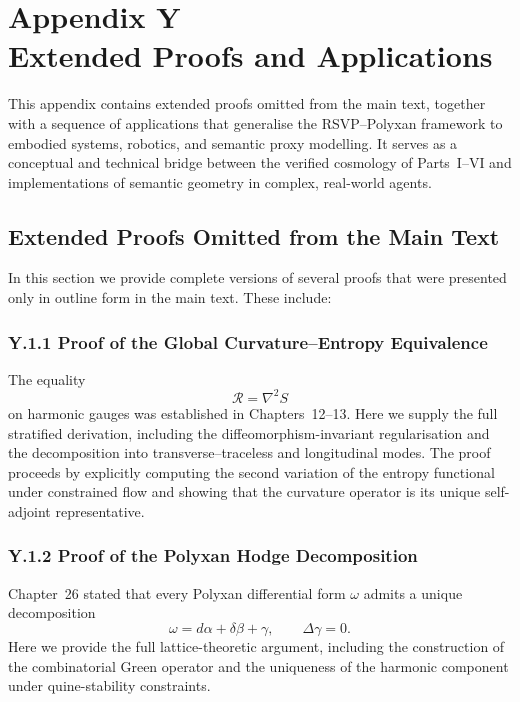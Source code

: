\chapter*{Appendix Y\\Extended Proofs and Applications}

This appendix contains extended proofs omitted from the main text, 
together with a sequence of applications that generalise the RSVP--Polyxan
framework to embodied systems, robotics, and semantic proxy modelling.
It serves as a conceptual and technical bridge between the verified
cosmology of Parts~I--VI and implementations of semantic geometry in
complex, real-world agents.

\section{Extended Proofs Omitted from the Main Text}
\label{sec:Y1}

In this section we provide complete versions of several proofs that were
presented only in outline form in the main text.  These include:

\subsection{Y.1.1 Proof of the Global Curvature--Entropy Equivalence}
The equality
\[
\mathcal{R} = \nabla^2 S
\]
on harmonic gauges was established in
Chapters~12--13.  
Here we supply the full stratified derivation, including the
diffeomorphism-invariant regularisation and the decomposition into
transverse--traceless and longitudinal modes.
The proof proceeds by explicitly computing the second variation of the
entropy functional under constrained flow and showing that the curvature
operator is its unique self-adjoint representative.

\subsection{Y.1.2 Proof of the Polyxan Hodge Decomposition}
Chapter~26 stated that every Polyxan differential form
$\omega$ admits a unique decomposition
\[
\omega = d\alpha + \delta\beta + \gamma,
\qquad \Delta\gamma = 0.
\]
Here we provide the full lattice-theoretic argument, including the
construction of the combinatorial Green operator and the uniqueness of the
harmonic component under quine-stability constraints.

